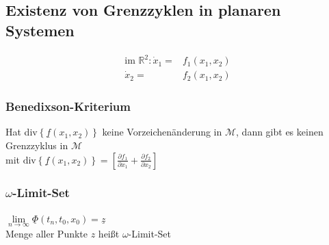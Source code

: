 \documentclass[german]{latex4ei/latex4ei_sheet}
\begin{document}
\begin{sectionbox}
\subsection{Existenz von Grenzzyklen in planaren Systemen}
\begin{emphbox}
\begin{align*}
  \text{im $\mathbb{R}^2$:} \,
  \dot{x}_1 =&  f_1(x_1, x_2) \\
  \dot{x}_2 =&  f_2(x_1, x_2)
\end{align*}
\end{emphbox}

\subsubsection{Benedixson-Kriterium}
Hat div$\left\{ \underline{f}(x_1, x_2) \right\}$ keine Vorzeichenänderung in $\mathcal{M}$, dann gibt es keinen Grenzzyklus in $\mathcal{M}$ \\
mit $\text{div}\left\{ \underline{f}(x_1, x_2) \right\} = \left[ \frac{\partial f_1}{\partial x_1} + \frac{\partial f_2}{ \partial x_2} \right]$

\subsubsection{$\omega$-Limit-Set}

$\lim\limits_{n \rightarrow \infty} \underline{\Phi} (t_n, t_0, x_0) = \underline{z}$ \\
Menge aller Punkte $z$ heißt $\omega$-Limit-Set
\end{sectionbox}
\end{document}
